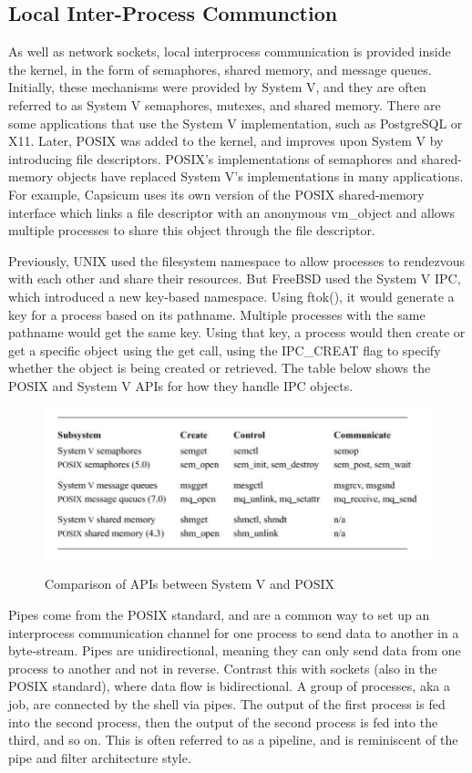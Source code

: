 \documentclass[12pt, dvipsnames, a4paper]{article}
\begin{document}
\subsection{Local Inter-Process Communction}
As well as network sockets, local interprocess communication is provided inside the kernel, in the form of semaphores, shared memory, and message queues. Initially, these mechanisms were provided by System V, and they are often referred to as System V semaphores, mutexes, and shared memory. There are some applications that use the System V implementation, such as PostgreSQL or X11. Later, POSIX was added to the kernel, and improves upon System V by introducing file descriptors. POSIX’s implementations of semaphores and shared-memory objects have replaced System V’s implementations in many applications. For example, Capsicum uses its own version of the POSIX shared-memory interface which links a file descriptor with an anonymous vm\_object and allows multiple processes to share this object through the file descriptor.

Previously, UNIX used the filesystem namespace to allow processes to rendezvous with each other and share their resources. But FreeBSD used the System V IPC, which introduced a new key-based namespace. Using ftok(), it would generate a key for a process based on its pathname. Multiple processes with the same pathname would get the same key. Using that key, a process would then create or get a specific object using the get call, using the IPC\_CREAT flag to specify whether the object is being created or retrieved. The table below shows the POSIX and System V APIs for how they handle IPC objects.

\newpage
\begin{figure}[hbt!]
  \centering
  \includegraphics[width=570pt]{assets/localipc1.png}
  \caption{Comparison of APIs between System V and POSIX} \cite{mckusick}
\end{figure}

Pipes come from the POSIX standard, and are a common way to set up an interprocess communication channel for one process to send data to another in a byte-stream. Pipes are unidirectional, meaning they can only send data from one process to another and not in reverse. Contrast this with sockets (also in the POSIX standard), where data flow is bidirectional. A group of processes, aka a job, are connected by the shell via pipes. The output of the first process is fed into the second process, then the output of the second process is fed into the third, and so on. This is often referred to as a pipeline, and is reminiscent of the pipe and filter architecture style.
\end{document}
